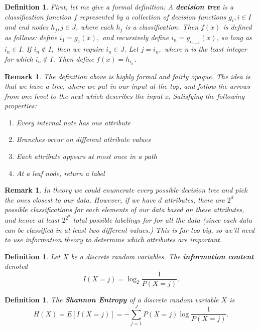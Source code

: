 \documentclass{amsart}
\newtheorem{defn}[subsubsection]{Definition}
\newtheorem{rem}[subsubsection]{Remark}
\begin{document}
\begin{defn}
First, let me give a formal definition:
A {\bf decision tree} is a classification function $f$ represented by a collection of decision functions $g_i,i \in I$ and end nodes $h_j,j \in J$, where each $h_j$ is a classification. Then $f(x)$ is defined as follows: define $i_1 = g_1(x),$ and recursively define $i_n = g_{i_{n-1}}(x)$, so long as $i_n \in I.$ If $i_n \notin I,$ then we require $i_n \in J.$ Let $j = i_n,$ where n is the least integer for which $i_n \notin I$. Then define $f(x) = h_{i_n}$.
\end{defn}

\begin{rem}
The definition above is highly formal and fairly opaque. The idea is that we have a tree, where we put in our input at the top, and follow the arrows from one level to the next which describes the input x. Satisfying the following properties:
\begin{enumerate}
\item Every internal note has one attribute
\item Branches occur on different attribute values
\item Each attribute appears at most once in a path
\item At a leaf node, return a label
\end{enumerate}
\end{rem}

\begin{rem}
In theory we could enumerate every possible decision tree and pick the ones closest to our data. However, if we have $d$ attributes, there are $2^d$ possible classifications for each elements of our data based on these attributes, and hence at least $2^{2^d}$ total possible labelings for for all the data (since each data can be classified in at least two different values.) This is far too big, so we'll need to use information theory to determine which attributes are important. 
\end{rem}

\begin{defn}
Let $X$ be a discrete random variables. The {\bf information content} denoted $$I(X=j) = \log_2 \frac{1}{P(X=j)}.$$
\end{defn}

\begin{defn}
The {\bf Shannon Entropy} of a discrete random variable $X$ is
$$H(X) = E[I(X=j)] = -\sum_{j=1}^J P(X=j) \log \frac 1 {P(X=j)}.$$
\end{defn}
\end{document}
